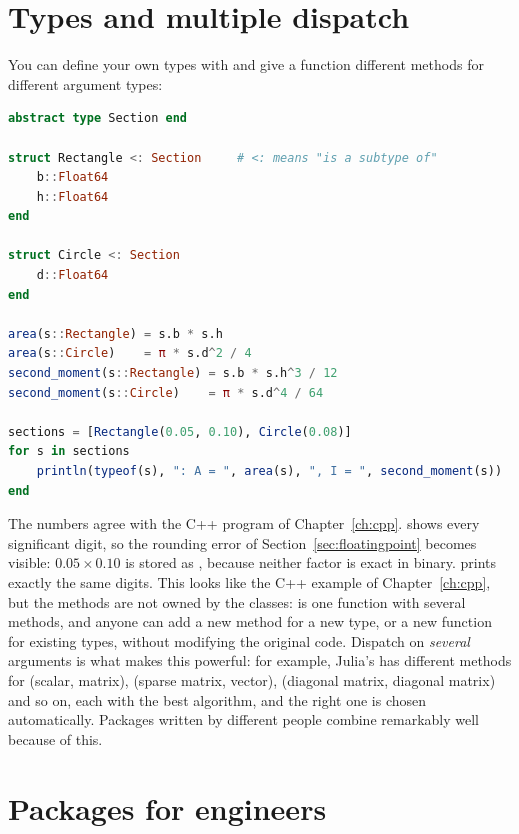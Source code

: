 \section{Types and multiple dispatch}
\label{sec:dispatch}

You can define your own types with  and give a function different methods
for different argument types:
\begin{lstlisting}[language=Julia]
abstract type Section end

struct Rectangle <: Section     # <: means "is a subtype of"
    b::Float64
    h::Float64
end

struct Circle <: Section
    d::Float64
end

area(s::Rectangle) = s.b * s.h
area(s::Circle)    = π * s.d^2 / 4
second_moment(s::Rectangle) = s.b * s.h^3 / 12
second_moment(s::Circle)    = π * s.d^4 / 64

sections = [Rectangle(0.05, 0.10), Circle(0.08)]
for s in sections
    println(typeof(s), ": A = ", area(s), ", I = ", second_moment(s))
end
\end{lstlisting}
The numbers agree with the C++ program of Chapter~\ref{ch:cpp}.  shows
every significant digit, so the rounding error of Section~\ref{sec:floatingpoint} becomes
visible: $0.05 \times 0.10$ is stored as , because neither factor
is exact in binary. \py prints exactly the same digits.
This looks like the C++ example of Chapter~\ref{ch:cpp}, but the methods are not owned by
the classes:  is one function with several methods, and anyone can add a new
method for a new type, or a new function for existing types, without modifying the
original code. Dispatch on \emph{several} arguments is what makes this powerful: for
example, Julia's \code{*} has different methods for (scalar, matrix), (sparse matrix,
vector), (diagonal matrix, diagonal matrix) and so on, each with the best algorithm, and
the right one is chosen automatically. Packages written by different people combine
remarkably well because of this.

\section{Packages for engineers}

